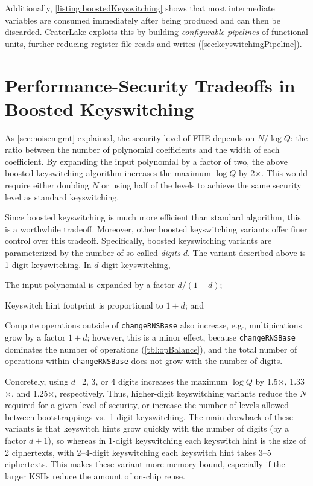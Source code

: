 Additionally, \autoref{listing:boostedKeyswitching} shows that most
intermediate variables are consumed immediately after being produced and can
then be discarded. CraterLake exploits this by building \emph{configurable
pipelines} of functional units, further reducing register file reads and writes
(\autoref{sec:keyswitchingPipeline}).

\section{Performance-Security Tradeoffs in Boosted Keyswitching}
\label{sec:boostedSecurity}

As \autoref{sec:noisemgmt} explained, the security level of FHE depends on
$N/\log Q$: the ratio between the number of polynomial coefficients and the width
of each coefficient. By expanding the input polynomial by a factor of two, the
above boosted keyswitching algorithm increases the maximum $\log Q$ by 2$\times$.
This would require either doubling $N$ or using half of the levels to achieve
the same security level as standard keyswitching.

Since boosted keyswitching is much more efficient than standard algorithm, this
is a worthwhile tradeoff. Moreover, other boosted keyswitching variants offer
finer control over this tradeoff. Specifically, boosted keyswitching variants
are parameterized by the number of so-called \emph{digits} $d$. The variant
described above is 1-digit keyswitching.
In $d$-digit keyswitching,
\begin{compactenum}
\item The input polynomial is expanded by a factor $d/(1+d)$;
\item Keyswitch hint footprint is proportional to $1+d$; and
\item Compute operations outside of \texttt{changeRNSBase} also increase, e.g.,
    multipications grow by a factor $1+d$; however, this is a minor effect,
    because \texttt{changeRNSBase} dominates the number of operations
    (\autoref{tbl:opBalance}), and the total number of operations within
    \texttt{changeRNSBase} does not grow with the number of digits.
\end{compactenum}

Concretely, using $d$=2, 3, or 4 digits increases the maximum $\log Q$ by
1.5$\times$, 1.33$\times$, and 1.25$\times$, respectively. Thus, higher-digit
keyswitching variants reduce the $N$ required for a given level of security, or
increase the number of levels allowed between bootstrappings vs.\ 1-digit
keyswitching. The main drawback of these variants is that keyswitch hints grow
quickly with the number of digits (by a factor $d+1$), so whereas in 1-digit
keyswitching each keyswitch hint is the size of 2 ciphertexts, with 2--4-digit
keyswitching each keyswitch hint takes 3--5 ciphertexts. This makes these
variant more memory-bound, especially if the larger KSHs reduce the amount of
on-chip reuse.

